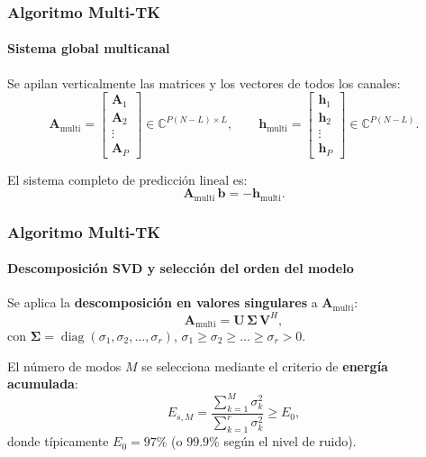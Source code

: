 \documentclass{beamer}
\begin{document}
\begin{frame}
\frametitle{Algoritmo Multi-TK}
\framesubtitle{Sistema global multicanal}

Se apilan verticalmente las matrices y los vectores de todos los canales:
\begin{equation}
\mathbf{A}_{\text{multi}} =
\begin{bmatrix} \mathbf{A}_1 \\ \mathbf{A}_2 \\ \vdots \\ \mathbf{A}_P \end{bmatrix}
\in \mathbb{C}^{P(N-L)\times L},
\qquad
\mathbf{h}_{\text{multi}} =
\begin{bmatrix} \mathbf{h}_1 \\ \mathbf{h}_2 \\ \vdots \\ \mathbf{h}_P \end{bmatrix}
\in \mathbb{C}^{P(N-L)}.
\label{eq:multi_system}
\end{equation}

El sistema completo de predicción lineal es:
\begin{equation}
\boxed{\mathbf{A}_{\text{multi}}\,\mathbf{b} = -\mathbf{h}_{\text{multi}}}.
\label{eq:multi_equation}
\end{equation}
\end{frame}
\begin{frame}
\frametitle{Algoritmo Multi-TK}
\framesubtitle{Descomposición SVD y selección del orden del modelo}

Se aplica la \textbf{descomposición en valores singulares} a $\mathbf{A}_{\text{multi}}$:
\begin{equation}
\mathbf{A}_{\text{multi}} = \mathbf{U}\,\boldsymbol{\Sigma}\,\mathbf{V}^H,
\label{eq:svd}
\end{equation}
con $\boldsymbol{\Sigma} = \operatorname{diag}(\sigma_1,\sigma_2,\dots,\sigma_r)$, $\sigma_1 \ge \sigma_2 \ge \dots \ge \sigma_r > 0$.

El número de modos $M$ se selecciona mediante el criterio de \textbf{energía acumulada}:
\begin{equation}
E_{s,M} = \frac{\displaystyle\sum_{k=1}^{M} \sigma_k^2}{\displaystyle\sum_{k=1}^{r} \sigma_k^2} \ge E_0,
\label{eq:energy}
\end{equation}
donde típicamente $E_0 = 97\%$ (o $99.9\%$ según el nivel de ruido).
\end{frame}
\end{document}
